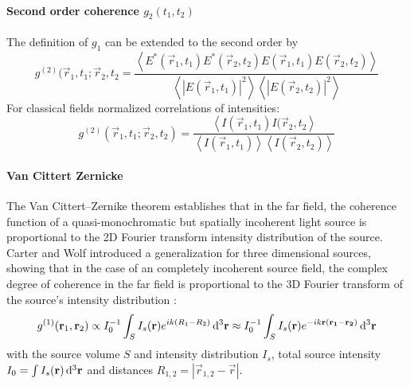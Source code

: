 \paragraph{Second order coherence $g_2(t_1,t_2)$}
The definition of $g_1$ can be extended to the second order by
\begin{equation*}
	g^{(2)}(\vec{r}_1,t_1;\vec{r}_2,t_2= 
	\frac{\left< E^*(\vec{r}_1,t_1)E^*(\vec{r}_2,t_2)E(\vec{r}_1,t_1)E(\vec{r}_2,t_2) \right>}{\left<\left | E(\vec{r}_1,t_1)\right |^2 \right> \left< \left |E(\vec{r}_2,t_2)\right |^2 \right>}	
\end{equation*}
For classical fields normalized correlations of intensities:
\begin{equation}
	g^{(2)}(\vec{r}_1,t_1;\vec{r}_2,t_2)= 
		\frac{\left< I(\vec{r}_1,t_1)I(\vec{r}_2,t_2 \right>}{\left<I(\vec{r}_1,t_1)\right>\left<I(\vec{r}_2,t_2)\right>}	
		\label{eq:g2}
\end{equation}

\paragraph{Van Cittert Zernicke}
The Van Cittert–Zernike theorem establishes that in the far field, the coherence function of a 
quasi-monochromatic but spatially incoherent light source is proportional to the 2D Fourier transform intensity distribution of the source. Carter and Wolf introduced a generalization for three dimensional sources, showing that in the case of an completely incoherent source field, the complex degree of coherence in the far field is proportional to the 3D Fourier transform of the source's intensity distribution \cite{rosen1996, goodman2005, carter1981}:
\begin{equation}
	g^{(1)}(\mathbf{r}_1,\mathbf{r}_2) \propto I_0^{-1} \int_{S} I_s(\mathbf{r}) e^{ik(R_1-R_2)} \operatorname{\mathrm{d}^3 \!} \mathbf{r} \approx I_0^{-1} \int_{S} I_s(\mathbf{r}) e^{-ik\mathbf{r}(\mathbf{r_1}-\mathbf{r_2})} \operatorname{\mathrm{d}^3 \!} \mathbf{r}
	\label{eq:vcz}
\end{equation}
with the source volume $S$ and intensity distribution $I_s$, total source intensity $I_0=\int I_s(\mathbf{r}) \operatorname{\mathrm{d}^3 \!} \mathbf{r}$ and distances $R_{1,2}=\left|\vec{r}_{1,2}-\vec{r}\right|$.





